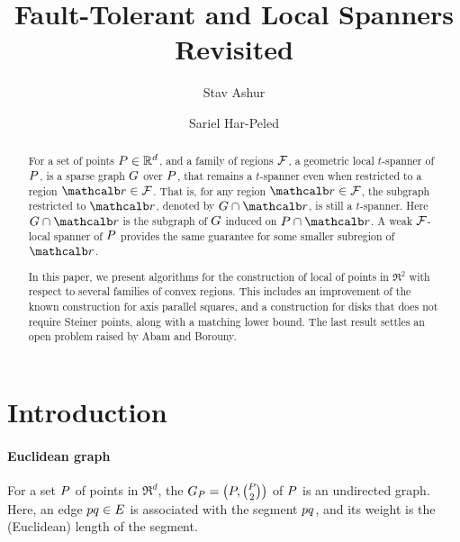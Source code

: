 \documentclass[12pt]{article}%
\begin{document}
\title{Fault-Tolerant and Local Spanners Revisited}

\author{%
   Stav Ashur%
   \StavThanks{}%
   \and%
   Sariel Har-Peled%
}%

\maketitle



\begin{abstract}
    For a set of points $P\in \mathbb{R}^d$, and a family of regions $\mathcal{F}$,
    a geometric local $t$-spanner of $P$, is a sparse graph $G$
    over $P$, that remains a $t$-spanner even when restricted to a
    region $\region \in \FF$. That is, for any region
    $\region \in \FF$, the subgraph restricted to $\region$, denoted
    by $\restrictY{\G}{\region}$, is still a $t$-spanner. Here
    $\restrictY{\G}{\region}$ is the subgraph of $G$ induced on
    $\PS \cap \region$.  A weak $\mathcal{F}$-local spanner of $P$
    provides the same guarantee for some smaller subregion of
    $\region$.

    In this paper, we present algorithms for the construction of local
    of points in $\Re^2$ with respect to several families of convex
    regions. This includes an improvement of the known construction
    for axis parallel squares, and a construction for disks that does
    not require Steiner points, along with a matching lower bound. The
    last result settles an open problem raised by Abam and Borouny.
\end{abstract}



\section{Introduction}

\paragraph{Euclidean graph}
For a set $P$ of points in $\Re^d$, the 
$G_P = \bigl(P, \binom{P}{2}\bigr)$ of $P$ is an undirected
graph.  Here, an edge $p q \in E$ is associated with the segment
$pq$, and its weight is the (Euclidean) length of the segment.
\end{document}
